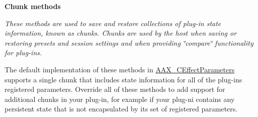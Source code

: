 \begin{Indent}\textbf{ Chunk methods}\par
{\em These methods are used to save and restore collections of plug-\/in state information, known as chunks. Chunks are used by the host when saving or restoring presets and session settings and when providing \char`\"{}compare\char`\"{} functionality for plug-\/ins.

The default implementation of these methods in \mbox{\hyperlink{a01481}{A\+A\+X\+\_\+\+C\+Effect\+Parameters}} supports a single chunk that includes state information for all of the plug-\/in\textquotesingle{}s registered parameters. Override all of these methods to add support for additional chunks in your plug-\/in, for example if your plug-\/ni contains any persistent state that is not encapsulated by its set of registered parameters.

}
\end{Indent}
